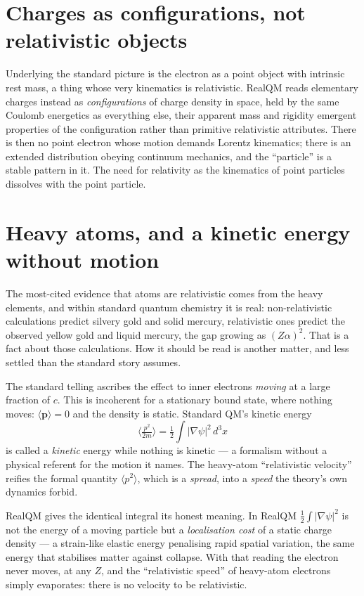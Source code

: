 \documentclass[11pt]{article}
\begin{document}
\section{Charges as configurations, not relativistic objects}

Underlying the standard picture is the electron as a point object with intrinsic rest mass, a thing whose very
kinematics is relativistic. RealQM reads elementary charges instead as \emph{configurations} of charge density in
space, held by the same Coulomb energetics as everything else, their apparent mass and rigidity emergent
properties of the configuration rather than primitive relativistic attributes. There is then no point electron
whose motion demands Lorentz kinematics; there is an extended distribution obeying continuum mechanics, and the
``particle'' is a stable pattern in it. The need for relativity as the kinematics of point particles dissolves
with the point particle.

\section{Heavy atoms, and a kinetic energy without motion}

The most-cited evidence that atoms are relativistic comes from the heavy elements, and within standard quantum
chemistry it is real: non-relativistic calculations predict silvery gold and solid mercury, relativistic ones
predict the observed yellow gold and liquid mercury, the gap growing as $(Z\alpha)^2$. That is a fact about those
calculations. How it should be read is another matter, and less settled than the standard story assumes.

The standard telling ascribes the effect to inner electrons \emph{moving} at a large fraction of $c$. This is
incoherent for a stationary bound state, where nothing moves: $\langle\mathbf p\rangle=0$ and the density is
static. Standard QM's kinetic energy
\[
\Big\langle \tfrac{p^2}{2m}\Big\rangle = \tfrac12\int|\nabla\psi|^2\,d^3x
\]
is called a \emph{kinetic} energy while nothing is kinetic --- a formalism without a physical referent for the
motion it names. The heavy-atom ``relativistic velocity'' reifies the formal quantity $\langle p^2\rangle$, which
is a \emph{spread}, into a \emph{speed} the theory's own dynamics forbid.

RealQM gives the identical integral its honest meaning. In RealQM $\tfrac12\int|\nabla\psi|^2$ is not the energy
of a moving particle but a \emph{localisation cost} of a static charge density --- a strain-like elastic energy
penalising rapid spatial variation, the same energy that stabilises matter against collapse. With that reading
the electron never moves, at any $Z$, and the ``relativistic speed'' of heavy-atom electrons simply evaporates:
there is no velocity to be relativistic.
\end{document}
